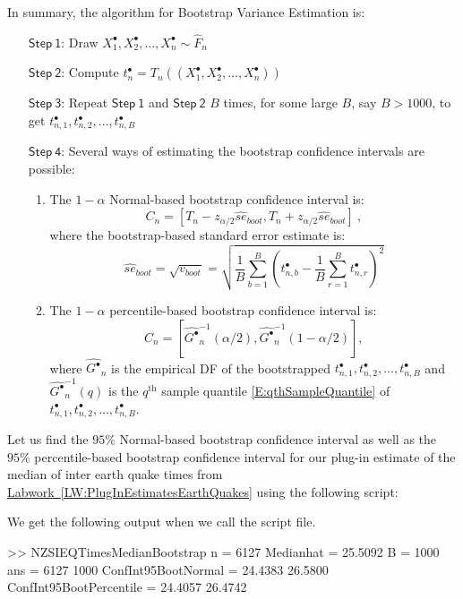 In summary, the algorithm for Bootstrap Variance Estimation is:

\begin{enumerate}
\item[$\mathsf{Step~1}$:] Draw $X^{\bullet}_1,X^{\bullet}_2,\ldots,X^{\bullet}_n \sim \widehat{F}_n$
\item[$\mathsf{Step~2}$:] Compute $t_n^{\bullet} = T_n((X^{\bullet}_1,X^{\bullet}_2,\ldots,X^{\bullet}_n))$
\item[$\mathsf{Step~3}$:] Repeat $\mathsf{Step~1}$ and $\mathsf{Step~2}$ $B$ times, for some large $B$, say $B>1000$, to get $t_{n,1}^{\bullet}, t_{n,2}^{\bullet},\ldots,t_{n,B}^{\bullet}$
\item[$\mathsf{Step~4}$:] Several ways of estimating the bootstrap confidence intervals are possible:
\begin{enumerate}
\item The  $1-\alpha$ Normal-based bootstrap confidence interval is:
\[
C_n = [T_n - z_{\alpha/2} \widehat{se}_{boot}, T_n + z_{\alpha/2} \widehat{se}_{boot}] \ ,
\]
where the bootstrap-based standard error estimate is:
\[
\widehat{se}_{boot} = \sqrt{v_{boot}} = \sqrt{ \frac{1}{B} \sum_{b=1}^B \left(  t_{n,b}^{\bullet} - \frac{1}{B} \sum_{r=1}^B t_{n,r}^{\bullet} \right)^2}
\]
\item The $1-\alpha$ percentile-based bootstrap confidence interval is:\\
\[
C_n=[\widehat{G^{\bullet}}_{n}^{-1}(\alpha/2),\widehat{G^{\bullet}}_{n}^{-1}(1-\alpha/2)] ,
\]
where $\widehat{G^{\bullet}}_{n}$ is the empirical DF of the bootstrapped $t_{n,1}^{\bullet}, t_{n,2}^{\bullet},\ldots,t_{n,B}^{\bullet}$ and $\widehat{G^{\bullet}}_{n}^{-1}(q)$ is the $q^{\text{th}}$ sample quantile \eqref{E:qthSampleQuantile} of $t_{n,1}^{\bullet}, t_{n,2}^{\bullet},\ldots,t_{n,B}^{\bullet}$.
\end{enumerate}
\end{enumerate}

\begin{labwork} \label{LW:NZSIEQTimesMedianBootstrap}
Let us find the $95\%$ Normal-based bootstrap confidence interval as well as the  $95\%$ percentile-based bootstrap confidence interval for our plug-in estimate of the median of inter earth quake times from \hyperref[LW:PlugInEstimatesEarthQuakes]{Labwork~\ref*{LW:PlugInEstimatesEarthQuakes}} using the following script:

We get the following output when we call the script file.
\begin{VrbM}
>> NZSIEQTimesMedianBootstrap
n =        6127
Medianhat =   25.5092
B =        1000
ans =        6127        1000
ConfInt95BootNormal =   24.4383   26.5800
ConfInt95BootPercentile =   24.4057   26.4742
\end{VrbM}
\end{labwork}

